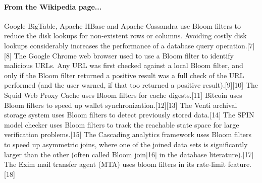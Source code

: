 \paragraph{From the Wikipedia page...}
Google BigTable, Apache HBase and Apache Cassandra use Bloom filters to reduce the disk lookups for non-existent rows or columns. Avoiding costly disk lookups considerably increases the performance of a database query operation.[7][8]
The Google Chrome web browser used to use a Bloom filter to identify malicious URLs. Any URL was first checked against a local Bloom filter, and only if the Bloom filter returned a positive result was a full check of the URL performed (and the user warned, if that too returned a positive result).[9][10]
The Squid Web Proxy Cache uses Bloom filters for cache digests.[11]
Bitcoin uses Bloom filters to speed up wallet synchronization.[12][13]
The Venti archival storage system uses Bloom filters to detect previously stored data.[14]
The SPIN model checker uses Bloom filters to track the reachable state space for large verification problems.[15]
The Cascading analytics framework uses Bloom filters to speed up asymmetric joins, where one of the joined data sets is significantly larger than the other (often called Bloom join[16] in the database literature).[17]
The Exim mail transfer agent (MTA) uses bloom filters in its rate-limit feature.[18]

